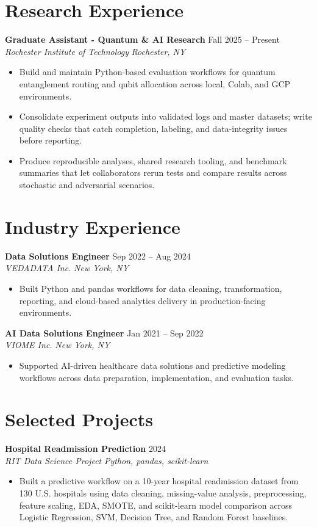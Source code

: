 \documentclass[10pt,letterpaper]{article}
\newcommand{\entry}[4]{
  \textbf{#1} \hfill #2 \\
  \textit{#3} \hfill \textit{#4}
}
\begin{document}
\section{Research Experience}
\entry{Graduate Assistant - Quantum \& AI Research}{Fall 2025 -- Present}{Rochester Institute of Technology}{Rochester, NY}
\begin{itemize}
    \item Build and maintain Python-based evaluation workflows for quantum entanglement routing and qubit allocation across local, Colab, and GCP environments.
    \item Consolidate experiment outputs into validated logs and master datasets; write quality checks that catch completion, labeling, and data-integrity issues before reporting.
    \item Produce reproducible analyses, shared research tooling, and benchmark summaries that let collaborators rerun tests and compare results across stochastic and adversarial scenarios.
\end{itemize}

\section{Industry Experience}
\entry{Data Solutions Engineer}{Sep 2022 -- Aug 2024}{VEDADATA Inc.}{New York, NY}
\begin{itemize}
    \item Built Python and pandas workflows for data cleaning, transformation, reporting, and cloud-based analytics delivery in production-facing environments.
\end{itemize}

\entry{AI Data Solutions Engineer}{Jan 2021 -- Sep 2022}{VIOME Inc.}{New York, NY}
\begin{itemize}
    \item Supported AI-driven healthcare data solutions and predictive modeling workflows across data preparation, implementation, and evaluation tasks.
\end{itemize}

\section{Selected Projects}
\entry{Hospital Readmission Prediction}{2024}{RIT Data Science Project}{Python, pandas, scikit-learn}
\begin{itemize}
    \item Built a predictive workflow on a 10-year hospital readmission dataset from 130 U.S. hospitals using data cleaning, missing-value analysis, preprocessing, feature scaling, EDA, SMOTE, and scikit-learn model comparison across Logistic Regression, SVM, Decision Tree, and Random Forest baselines.
\end{itemize}
\end{document}
